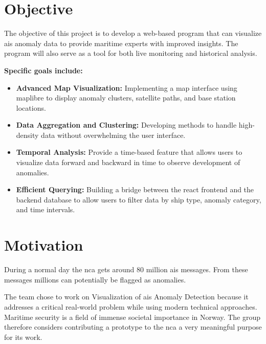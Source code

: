 \section{Objective}

The objective of this project is to develop a web-based program that can visualize \acrshort{ais} anomaly data to provide maritime experts with improved insights. The program will also serve as a tool for both live monitoring and historical analysis.

\textbf{Specific goals include:}
\begin{itemize}
\item \textbf{Advanced Map Visualization:} Implementing a map interface using \gls{maplibre} to display anomaly clusters, satellite paths, and base station locations.

\item \textbf{Data Aggregation and Clustering:} Developing methods to handle high-density data without overwhelming the user interface.

\item \textbf{Temporal Analysis:} Provide a time-based feature that allows users to visualize data forward and backward in time to observe development of anomalies.

\item \textbf{Efficient Querying:} Building a bridge between the \gls{react} frontend and the backend database to allow users to filter data by ship type, anomaly category, and time intervals.
\end{itemize}

\section{Motivation}

During a normal day the \acrshort{nca} gets around 80 million \acrshort{ais} messages. From these messages millions can potentially be flagged as anomalies. 

The team chose to work on Visualization of \acrshort{ais} Anomaly Detection because it addresses a critical real-world problem while using modern technical approaches. Maritime security is a field of immense societal importance in Norway. The group therefore considers contributing a prototype to the \acrshort{nca} a very meaningful purpose for its work.

